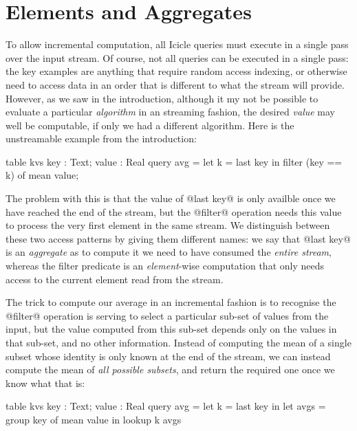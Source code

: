 
\eject
\section{Elements and Aggregates}

To allow incremental computation, all Icicle queries must execute in a single pass over the input stream. Of course, not all queries can be executed in a single pass: the key examples are anything that require random access indexing, or otherwise need to access data in an order that is different to what the stream will provide. However, as we saw in the introduction, although it my not be possible to evaluate a particular \emph{algorithm} in an streaming fashion, the desired \emph{value} may well be computable, if only we had a different algorithm. Here is the unstreamable example from the introduction:
\begin{code}
  table kvs { key : Text; value : Real }
  query avg = let k = last key
              in  filter (key == k) of mean value;
\end{code}

The problem with this is that the value of @last key@ is only availble once we have reached the end of the stream, but the @filter@ operation needs this value to process the very first element in the same stream. We distinguish between these two access patterns by giving them different names: we say that @last key@ is an \emph{aggregate} as to compute it we need to have consumed the \emph{entire stream}, whereas the filter predicate is an \emph{element}-wise computation that only needs access to the current element read from the stream.

The trick to compute our average in an incremental fashion is to recognise the @filter@ operation is serving to select a particular sub-set of values from the input, but the value computed from this sub-set depends only on the values in that sub-set, and no other information. Instead of computing the mean of a single subset whose identity is only known at the end of the stream, we can instead compute the mean of \emph{all possible subsets}, and return the required one once we know what that is:
\begin{code}
  table kvs { key : Text; value : Real } 
  query avg = let k    = last  key in
              let avgs = group key of mean value
              in  lookup k avgs
\end{code}

